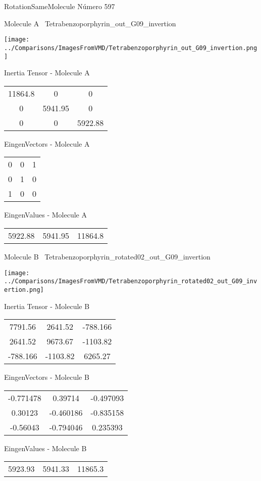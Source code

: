 \vtab[-3cm]
\begin{center}
{\large RotationSameMolecule \tab Número 597}
\end{center}
\begin{multicols}{2}
\begin{center}

Molecule A \
Tetrabenzoporphyrin\_out\_G09\_invertion

\texttt{[image: ../Comparisons/ImagesFromVMD/Tetrabenzoporphyrin\_out\_G09\_invertion.png]}

Inertia Tensor - Molecule A \\
\begin{tabular}{|c c c|}
11864.8	 & 	0	 & 	0	 \\
0	 & 	5941.95	 & 	0	 \\
0	 & 	0	 & 	5922.88
\end{tabular}

\vtab
 EingenVectors - Molecule A     \\
\begin{tabular}{|c c c|}
0	 & 	0	 & 	1	 \\
0	 & 	1	 & 	0	 \\
1	 & 	0	 & 	0
\end{tabular}

\vtab
 EingenValues - Molecule A     \\
\begin{tabular}{|c c c|}
5922.88	 & 	5941.95	 & 	11864.8	 \\
\end{tabular}
\columnbreak

Molecule B \
Tetrabenzoporphyrin\_rotated02\_out\_G09\_invertion

\texttt{[image: ../Comparisons/ImagesFromVMD/Tetrabenzoporphyrin\_rotated02\_out\_G09\_invertion.png]}

Inertia Tensor - Molecule B \\
\begin{tabular}{|c c c|}
7791.56	 & 	2641.52	 & 	-788.166	 \\
2641.52	 & 	9673.67	 & 	-1103.82	 \\
-788.166	 & 	-1103.82	 & 	6265.27
\end{tabular}

\vtab
 EingenVectors - Molecule B     \\
\begin{tabular}{|c c c|}
-0.771478	 & 	0.39714	 & 	-0.497093	 \\
0.30123	 & 	-0.460186	 & 	-0.835158	 \\
-0.56043	 & 	-0.794046	 & 	0.235393
\end{tabular}

\vtab
 EingenValues - Molecule B     \\
\begin{tabular}{|c c c|}
5923.93	 & 	5941.33	 & 	11865.3	 \\
\end{tabular}

\end{center}
\end{multicols}

